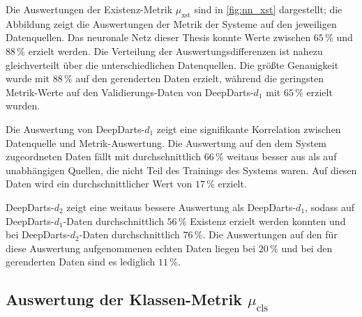 Die Auswertungen der Existenz-Metrik $\mu_\text{xst}$ sind in \autoref{fig:nn_xst} dargestellt; die Abbildung zeigt die Auswertungen der Metrik der Systeme auf den jeweiligen Datenquellen. Das neuronale Netz dieser Thesis konnte Werte zwischen $65\,\%$ und $88\,\%$ erzielt werden. Die Verteilung der Auswertungsdifferenzen ist nahezu gleichverteilt über die unterschiedlichen Datenquellen. Die größte Genauigkeit wurde mit $88\,\%$ auf den gerenderten Daten erzielt, während die geringsten Metrik-Werte auf den Validierungs-Daten von DeepDarts-$d_1$ mit $65\,\%$ erzielt wurden.

Die Auswertung von DeepDarts-$d_1$ zeigt eine signifikante Korrelation zwischen Datenquelle und Metrik-Auswertung. Die Auswertung auf den dem System zugeordneten Daten fällt mit durchschnittlich $66\,\%$ weitaus besser aus als auf unabhängigen Quellen, die nicht Teil des Trainings des Systems waren. Auf diesen Daten wird ein durchschnittlicher Wert von $17\,\%$ erzielt.

DeepDarts-$d_2$ zeigt eine weitaus bessere Auswertung als DeepDarts-$d_1$, sodass auf DeepDarts-$d_1$-Daten durchschnittlich $56\,\%$ Existenz erzielt werden konnten und bei DeepDarts-$d_2$-Daten durchschnittlich $76\,\%$. Die Auswertungen auf den für diese Auswertung aufgenommenen echten Daten liegen bei $20\,\%$ und bei den gerenderten Daten sind es lediglich $11\,\%$.


\subsection{Auswertung der Klassen-Metrik \texorpdfstring{$\mu_\text{cls}$}{µ\_cls}}
\label{sec:auswertung_cls}

\NNCls

